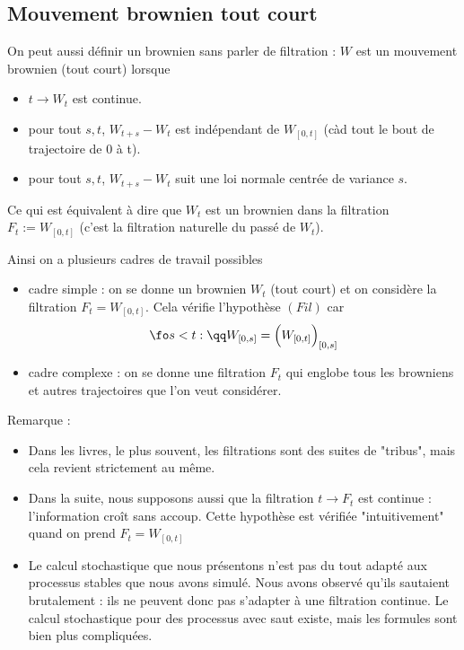 \documentclass{article}
\begin{document}
\subsection{Mouvement brownien tout court}

On peut aussi définir un brownien  sans parler de filtration :  $W$ est un mouvement brownien (tout court) lorsque
\begin{itemize}
\item $t \to W_t$ est continue. 
\item pour tout $s,t$, $W_{t+s}-W_t$ est indépendant de $W_{[0,t]}$ (càd tout le bout de trajectoire de 0 à t).
 \item pour tout $s,t$, $W_{t+s}-W_t$ suit une loi normale centrée de variance $s$. 
\end{itemize}
Ce qui est équivalent à dire que $W_t$ est un brownien dans la filtration $F_t :=W_{[0,t]}$ (c'est la filtration naturelle du passé de $W_t$). 

Ainsi on a plusieurs cadres de travail possibles
\begin{itemize}
\item   cadre simple : on se donne un brownien $W_t$ (tout court) et on considère la filtration $F_t= W_{[0,t]}$. Cela vérifie l'hypothèse $(Fil)$ car 
$$
\fo s<t : \qq W_{[0,s]} = \Big(W_{[0,t]} \Big)_{[0,s]}
$$
\item cadre complexe : on se donne une filtration $F_t$ qui englobe tous les browniens et autres trajectoires que l'on veut considérer. 
\end{itemize}



Remarque :   
\begin{itemize}
\item Dans les livres, le plus souvent, les filtrations sont des suites de "tribus", mais cela revient strictement au même. 
\item Dans la suite, nous supposons aussi que la filtration $t\to F_t$ est continue : l'information croît sans accoup.     Cette hypothèse est vérifiée "intuitivement" quand on prend $F_t=W_{[0,t]}$
\item Le calcul stochastique que nous présentons n'est pas du tout adapté aux processus stables que nous avons simulé. Nous avons observé qu'ils sautaient brutalement : ils ne peuvent donc pas s'adapter à une filtration continue. Le calcul stochastique pour des processus avec saut existe, mais les formules sont bien plus compliquées. 
\end{itemize}
\end{document}
